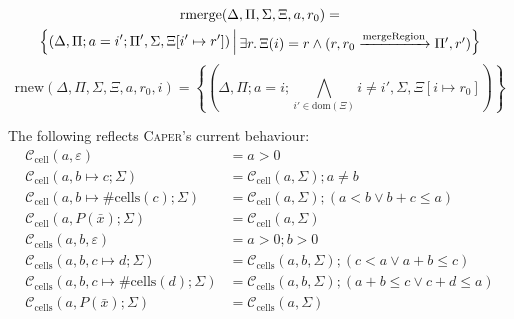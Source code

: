 \documentclass[a4paper]{article}
\makeatletter
\newcommand{\Set}[1]{\left\{#1\right\}}
\newcommand{\Setb}[2]{\left\{#1 \, \middle| \, \begin{array}{@{}l@{}}#2\end{array} \right\}}
\newcommand{\vctx}{\Delta}
\newcommand{\pcnds}{\Pi}
\newcommand{\preds}{\Sigma}
\newcommand{\regs}{\Xi}
\makeatother
\begin{document}
\begin{multline*}
  \mathrm{rmerge}(\vctx,\pcnds,\preds,\regs,a,r_0) = \\
  \Setb{(\vctx,\pcnds;a=i';\pcnds',\preds,\regs[i' \mapsto r'])}{\exists r \ldotp \regs(i) = r \land (r, r_0 \xrightarrow{\mathrm{mergeRegion}} \pcnds', r')}
\end{multline*}
\[
  \mathrm{rnew}(\vctx,\pcnds,\preds,\regs,a,r_0,i) = \Set{\left(\vctx,\pcnds;a=i;\bigwedge_{i' \in \mathrm{dom}(\regs)} i \neq i', \preds, \regs[i \mapsto r_0]\right)}
\]

The following reflects \textsc{Caper}'s current behaviour:
\begin{align*}
  \mathcal{C}_{\mathrm{cell}}(a,\varepsilon) &= a > 0 \\
  \mathcal{C}_{\mathrm{cell}}(a,b \mapsto c ; \preds) &= \mathcal{C}_{\mathrm{cell}}(a,\preds) ; a \neq b \\
  \mathcal{C}_{\mathrm{cell}}(a,b \mapsto \mathrm{\#cells}(c) ; \preds) &= \mathcal{C}_{\mathrm{cell}}(a,\preds) ; (a < b \lor b + c \leq a) \\
  \mathcal{C}_{\mathrm{cell}}(a,P(\bar{x}) ; \preds) &= \mathcal{C}_{\mathrm{cell}}(a,\preds) \\[1em]
  \mathcal{C}_{\mathrm{cells}}(a,b,\varepsilon) &= a > 0; b > 0\\
  \mathcal{C}_{\mathrm{cells}}(a,b, c \mapsto d ; \preds) &= \mathcal{C}_{\mathrm{cells}}(a,b,\preds) ; (c < a \lor a + b \leq c) \\
  \mathcal{C}_{\mathrm{cells}}(a,b, c \mapsto \mathrm{\#cells}(d) ; \preds) &= \mathcal{C}_{\mathrm{cells}}(a,b,\preds) ; (a + b \leq c \lor c + d \leq a) \\
  \mathcal{C}_{\mathrm{cells}}(a,P(\bar{x}) ; \preds) &= \mathcal{C}_{\mathrm{cells}}(a,\preds)
\end{align*}
\end{document}
